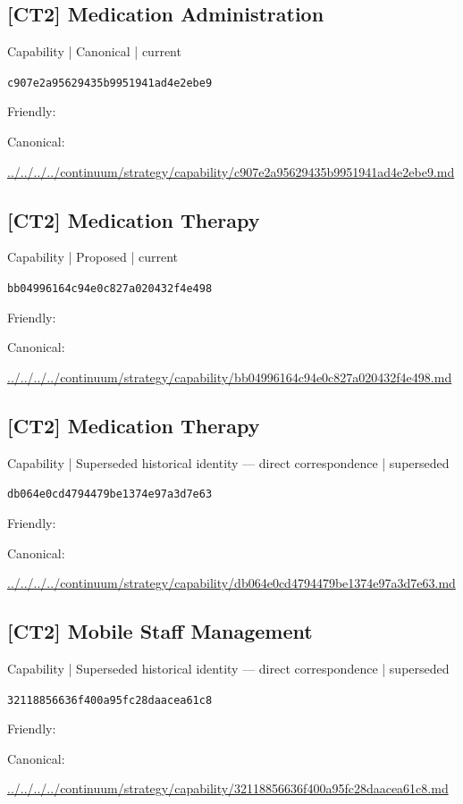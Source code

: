 \documentclass[10pt,a4paper]{article}
\begin{document}
\subsection*{[CT2] Medication Administration}
{\small Capability | Canonical | current}\par
\texttt{c907e2a95629435b9951941ad4e2ebe9}\par
Friendly: \par
Canonical: \par
{\footnotesize\url{../../../../continuum/strategy/capability/c907e2a95629435b9951941ad4e2ebe9.md}}\par
\subsection*{[CT2] Medication Therapy}
{\small Capability | Proposed | current}\par
\texttt{bb04996164c94e0c827a020432f4e498}\par
Friendly: \par
Canonical: \par
{\footnotesize\url{../../../../continuum/strategy/capability/bb04996164c94e0c827a020432f4e498.md}}\par
\subsection*{[CT2] Medication Therapy}
{\small Capability | Superseded historical identity — direct correspondence | superseded}\par
\texttt{db064e0cd4794479be1374e97a3d7e63}\par
Friendly: \par
Canonical: \par
{\footnotesize\url{../../../../continuum/strategy/capability/db064e0cd4794479be1374e97a3d7e63.md}}\par
\subsection*{[CT2] Mobile Staff Management}
{\small Capability | Superseded historical identity — direct correspondence | superseded}\par
\texttt{32118856636f400a95fc28daacea61c8}\par
Friendly: \par
Canonical: \par
{\footnotesize\url{../../../../continuum/strategy/capability/32118856636f400a95fc28daacea61c8.md}}\par
\end{document}
